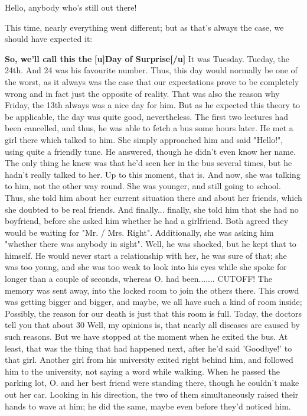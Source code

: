 Hello, anybody who's still out there!

This time, nearly everything went different; but as that's always the case, we should have expected it:

\textbf{So, we'll call this the}
\textbf{[u]Day of Surprise[/u]}
It was Tuesday. Tueday, the 24th. And 24 was his favourite number. Thus, this day would normally be one of the worst, as it always was the case that our expectations prove to be completely wrong and in fact just the opposite of reality. 
That was also the reason why Friday, the 13th always was a nice day for him. 
But as he expected this theory to be applicable, the day was quite good, nevertheless. 
The first two lectures had been cancelled, and thus, he was able to fetch a bus some hours later. 
He met a girl there which talked to him. 
She simply approached him and said "Hello!", using quite a friendly tune. 
He answered, though he didn't even know her name. The only thing he knew was that he'd seen her in the bus several times, but he hadn't really talked to her. 
Up to this moment, that is. 
And now, she was talking to him, not the other way round. 
She was younger, and still going to school. Thus, she told him about her current situation there and about her friends, which she doubted to be real friends. 
And finally...
finally, she told him that she had no boyfriend, before she asked him whether he had a girlfriend. 
Both agreed they would be waiting for "Mr. / Mrs. Right". Additionally, she was asking him "whether there was anybody in sight". 
Well, he was shocked, but he kept that to himself. 
He would never start a relationship with her, he was sure of that; she was too young, and she was too weak to look into his eyes while she spoke for longer than a couple of seconds, whereas O. had been....... CUTOFF!
The memory was sent away, into the locked room to join the others there. 
This crowd was getting bigger and bigger, and maybe, we all have such a kind of room inside; Possibly, the reason for our death is just that this room is full. 
Today, the doctors tell you that about 30 %
Well, my opinions is, that nearly all diseases are caused by such reasons. 
But we have stopped at the moment when he exited the bus. 
At least, that was the thing that had happened next, after he'd said 'Goodbye!' to that girl. 
Another girl from his university exited right behind him, and followed him to the university, not saying a word while walking. 
When he passed the parking lot, O. and her best friend were standing there, though he couldn't make out her car. Looking in his direction, the two of them simultaneously raised their hands to wave at him; he did the same, maybe even before they'd noticed him. 
